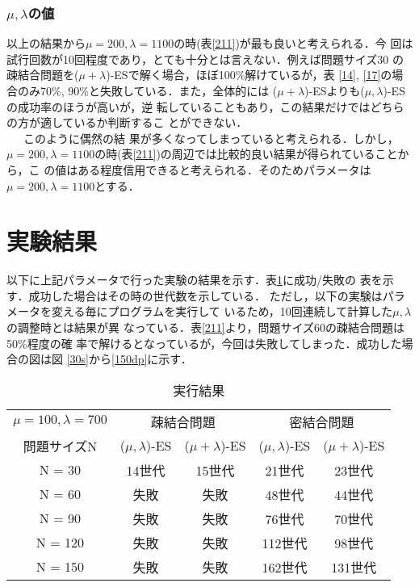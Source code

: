 \documentclass[a4j]{jarticle}
\begin{document}
\subsubsection*{$\mu ,\lambda$の値}
以上の結果から$\mu = 200, \lambda = 1100$の時(表\ref{211})が最も良いと考えられる．今
回は試行回数が10回程度であり，とても十分とは言えない．例えば問題サイズ30
の疎結合問題を($\mu + \lambda$)-ESで解く場合，ほぼ100\%解けているが，表
\ref{14}, \ref{17}の場合のみ70\%, 90\%と失敗している．また，全体的には
($\mu + \lambda$)-ESよりも($\mu , \lambda$)-ESの成功率のほうが高いが，逆
転していることもあり，この結果だけではどちらの方が適しているか判断するこ
とができない．\\\ \ \ 
このように偶然の結
果が多くなってしまっていると考えられる．しかし，$\mu = 200, \lambda =
1100$の時(表\ref{211})の周辺では比較的良い結果が得られていることから，こ
の値はある程度信用できると考えられる．そのためパラメータは$\mu = 200,
\lambda = 1100$とする．

\section*{実験結果}
以下に上記パラメータで行った実験の結果を示す．表\ref{result}に成功/失敗の
表を示す．成功した場合はその時の世代数を示している．
ただし，以下の実験はパラメータを変える毎にプログラムを実行して
いるため，10回連続して計算した$\mu, \lambda$の調整時とは結果が異
なっている．表\ref{211}より，問題サイズ60の疎結合問題は50\%程度の確
率で解けるとなっているが，今回は失敗してしまった．成功した場合の図は図
\ref{30s}から\ref{150dp}に示す．

\begin{table}[htb]
 \begin{center}
  \begin{tabular}[tb]{|c||c|c||c|c|} \hline
   $\mu = 100, \lambda = 700$& \multicolumn{2}{c||}{疎結合問題} &
   \multicolumn{2}{c|}{密結合問題} \\ \cline{2-5}
   問題サイズN& ($\mu, \lambda$)-ES& ($\mu + \lambda$)-ES& ($\mu, \lambda$)-ES&
   ($\mu + \lambda$)-ES \\ \hline \hline
   N = 30& 14世代& 15世代& 21世代& 23世代\\ \hline
   N = 60& 失敗&失敗 & 48世代& 44世代\\ \hline
   N = 90& 失敗&失敗 & 76世代& 70世代\\ \hline
   N = 120& 失敗&失敗 & 112世代& 98世代\\ \hline
   N = 150& 失敗&失敗 & 162世代& 131世代\\ \hline
  \end{tabular}
  \caption{実行結果}
  \label{result}
 \end{center}
\end{table}
\end{document}

